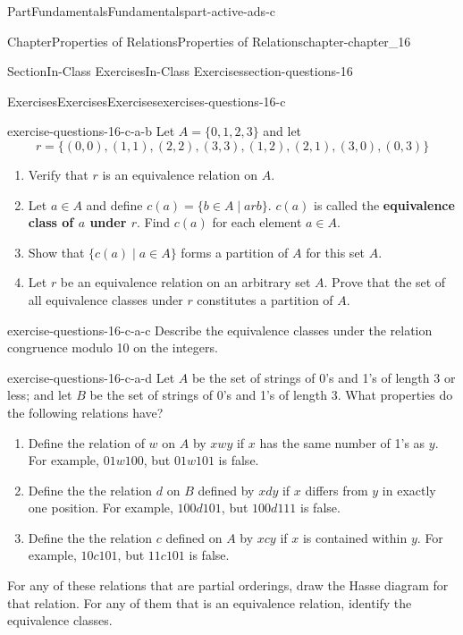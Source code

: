 \documentclass[oneside,10pt,]{book}
\newcommand{\terminology}[1]{\textbf{#1}}
\numberwithin{equation}{section}
\begin{document}
\begin{partptx}{Part}{Fundamentals}{}{Fundamentals}{}{}{part-active-ads-c}
\begin{chapterptx}{Chapter}{Properties of Relations}{}{Properties of Relations}{}{}{chapter-chapter_16}
\begin{sectionptx}{Section}{In-Class Exercises}{}{In-Class Exercises}{}{}{section-questions-16}
\begin{exercises-subsection-numberless}{Exercises}{Exercises}{}{Exercises}{}{}{exercises-questions-16-c}
\begin{exercisegroup}
\begin{divisionexerciseeg}{2}{}{}{exercise-questions-16-c-a-b}
Let \(A = \{0, 1, 2, 3\}\) and let%
\begin{equation*}
r = \{(0, 0), (1, 1), (2, 2), (3, 3), (1, 2), (2, 1), (3, 0), (0, 3)\}
\end{equation*}
%
\begin{enumerate}[label=(\alph*)]
\item{}Verify that \(r\) is an equivalence relation on \(A\).%
\item{}Let \(a \in A\) and define \(c(a) = \{b \in A \mid a rb\}\). \label{notation-questions-16-c-a-b-a-a-c-b-a-c} \(c(a)\) is called the \terminology{equivalence class of \(a\) under \(r\)}. Find \(c(a)\) for each element \(a \in A\).%
\item{}Show that \(\{c(a) \mid  a \in A\}\) forms a partition of \(A\) for this set \(A\).%
\item{}Let \(r\) be an equivalence relation on an arbitrary set \(A\). Prove that the set of all equivalence classes under \(r\) constitutes a partition of \(A\).%
\end{enumerate}
%
\end{divisionexerciseeg}%
\begin{divisionexerciseeg}{3}{}{}{exercise-questions-16-c-a-c}%
Describe the equivalence classes under the relation congruence modulo 10 on the integers.%
\end{divisionexerciseeg}%
\begin{divisionexerciseeg}{4}{}{}{exercise-questions-16-c-a-d}%
Let \(A\) be the set of strings of 0's and 1's of length 3 or less; and let \(B\) be the set of strings of 0's and 1's of length 3. What properties do the following relations have?%
\begin{enumerate}[label=(\alph*)]
\item{}Define the relation of \(w\) on \(A\) by \(x w y\) if \(x\) has the same number of 1's as \(y\). For example, \(01 w 100\), but \(01 w 101\) is false.%
\item{}Define the the relation \(d\)  on \(B\) defined by \(x d y\) if \(x\) differs from \(y\) in exactly one position. For example, \(100 d 101\), but \(100 d 111\) is false.%
\item{}Define the the relation \(c\) defined  on \(A\) by \(x c y\) if \(x\) is contained within \(y\). For example, \(10 c 101\), but \(11 c 101\) is false.%
\end{enumerate}
For any of these relations that are partial orderings, draw the Hasse diagram for that relation.  For any of them that is an equivalence relation, identify the equivalence classes.%

\end{divisionexerciseeg}
\end{exercisegroup}
\end{exercises-subsection-numberless}
\end{sectionptx}
\end{chapterptx}
\end{partptx}
\end{document}
